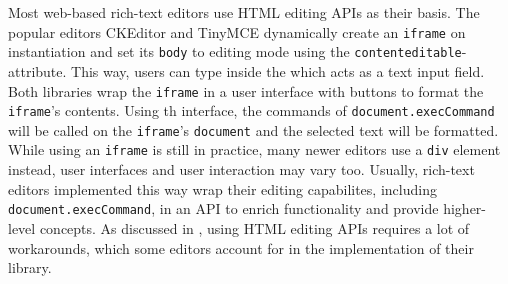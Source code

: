 Most web-based rich-text editors use HTML editing APIs as their basis. The popular editors CKEditor and TinyMCE dynamically create an \texttt{iframe} on instantiation and set its \texttt{body} to editing mode using the \texttt{contenteditable}-attribute. This way, users can type inside the  which acts as a text input field. Both libraries wrap the \texttt{iframe} in a user interface with buttons to format the \texttt{iframe}'s contents. Using th interface, the commands of \texttt{document.execCommand} will be called on the \texttt{iframe}'s \texttt{document} and the selected text will be formatted. While using an \texttt{iframe} is still in practice, many newer editors use a  \texttt{div} element instead, user interfaces and user interaction may vary too.
Usually, rich-text editors implemented this way wrap their editing capabilites, including \texttt{document.execCommand}, in an API to enrich functionality and provide higher-level concepts. As discussed in , using HTML editing APIs requires a lot of workarounds, which some editors account for in the implementation of their library.
